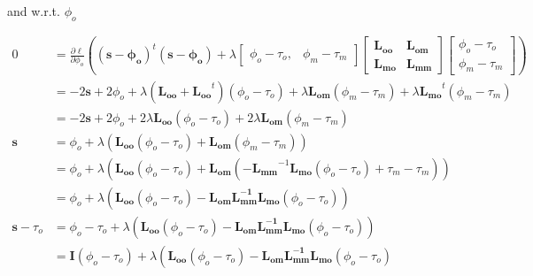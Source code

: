         \noindent and w.r.t. $\phi_o$

        \begin{align}
            0 &= \frac{\partial\ell}{\partial\phi_o}\left((\mathbf{s} - \mathbf{\phi_o}
                )^t(\mathbf{s} - \mathbf{\phi_o}) + \lambda
                \begin{bmatrix}
                    \phi_o - \tau_o, & \phi_m - \tau_m
                \end{bmatrix}
                \begin{bmatrix}
                    \mathbf{L_{oo}} & \mathbf{L_{om}} \\ \mathbf{L_{mo}} & \mathbf{L_{mm}}
                \end{bmatrix}
                \begin{bmatrix}
                    \phi_o - \tau_o \\ \phi_m - \tau_m
                \end{bmatrix}\right)\\
            &= -2\mathbf{s} + 2\phi_o +\lambda\left(\mathbf{L_{oo}} + \mathbf{L_{oo}}^t\right)(
                \phi_o - \tau_o) + \lambda\mathbf{L_{om}}(\phi_m - \tau_m) + \lambda\mathbf{
                L_{mo}}^t(\phi_m - \tau_m) \nonumber\\
            &= -2\mathbf{s} + 2\phi_o + 2\lambda\mathbf{L_{oo}}( \phi_o - \tau_o) + 2\lambda
                \mathbf{L_{om}}(\phi_m - \tau_m) \nonumber\\
            \mathbf{s} &= \phi_o + \lambda\left(\mathbf{L_{oo}}( \phi_o - \tau_o) +
                \mathbf{L_{om}}(\phi_m - \tau_m)\right) \nonumber\\
            &= \phi_o + \lambda\left(\mathbf{L_{oo}}( \phi_o - \tau_o) +
                \mathbf{L_{om}}(-\mathbf{L_{mm}}^{-1}\mathbf{L_{mo}}(
                \phi_o - \tau_o) + \tau_m - \tau_m)\right) \nonumber\\
            &= \phi_o + \lambda\left(\mathbf{L_{oo}}(\phi_o - \tau_o) -
                \mathbf{L_{om}}\mathbf{L_{mm}^{-1}}\mathbf{L_{mo}}(\phi_o - \tau_o)
                \right) \nonumber\\
            \mathbf{s} - \tau_o &= \phi_o - \tau_o + \lambda\left(\mathbf{L_{oo}}(\phi_o - \tau_o) -
                \mathbf{L_{om}}\mathbf{L_{mm}^{-1}}\mathbf{L_{mo}}(\phi_o - \tau_o)
                \right) \nonumber\\
            &= \mathbf{I}(\phi_o - \tau_o) + \lambda\left(\mathbf{L_{oo}}(\phi_o - \tau_o) -
                \mathbf{L_{om}}\mathbf{L_{mm}^{-1}}\mathbf{L_{mo}}(\phi_o - \tau_o)

\end{align}
